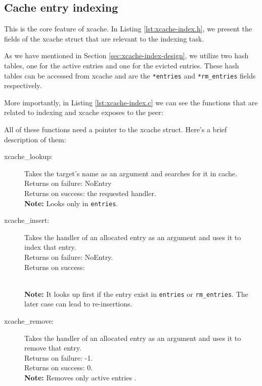 \subsection{Cache entry indexing}

This is the core feature of xcache. In Listing \ref{lst:xcache-index.h}, we 
present the fields of the xcache struct that are relevant to the indexing task.


As we have mentioned in Section \ref{sec:xcache-index-design}, we utilize two 
hash tables, one for the active entries and one for the evicted entries. These 
hash tables can be accessed from xcache and are the \texttt{*entries} and 
\texttt{*rm\_entries} fields respectively.

More importantly, in Listing \ref{lst:xcache-index.c} we can see the functions 
that are related to indexing and xcache exposes to the peer:


All of these functions need a pointer to the xcache struct. Here's a brief 
description of them:

\begin{description}
	\item[xcache\_lookup:]
		Takes the target's name as an argument and searches for it in 
		cache.\\
		Returns on failure: NoEntry\\
		Returns on success: the requested handler.\\
		\textbf{Note:} Looks only in \texttt{entries}.
	\item[xcache\_insert:]
		Takes the handler of an allocated entry as an argument and uses 
		it to index that entry.\\
		Returns on failure: NoEntry.\\
		Returns on success:
		\\
		\textbf{Note:} It looks up first if the entry exist in 
		\texttt{entries} or \texttt{rm\_entries}. The later case can 
		lead to re-insertions.
		\item[xcache\_remove:]
			Takes the handler of an allocated entry as an argument and uses 
			it to remove that entry.\\
			Returns on failure: -1.\\
			Returns on success: 0.\\
			\textbf{Note:} Removes only active entries .
\end{description}

